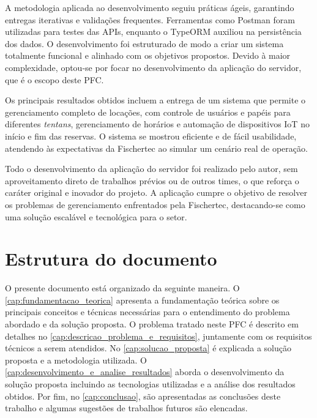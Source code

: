 A metodologia aplicada ao desenvolvimento seguiu práticas ágeis, garantindo entregas iterativas e validações frequentes. Ferramentas como Postman foram utilizadas para testes das APIs, enquanto o TypeORM auxiliou na persistência dos dados. O desenvolvimento foi estruturado de modo a criar um sistema totalmente funcional e alinhado com os objetivos propostos. Devido à maior complexidade, optou-se por focar no desenvolvimento da aplicação do servidor, que é o escopo deste PFC.

Os principais resultados obtidos incluem a entrega de um sistema que permite o gerenciamento completo de locações, com controle de usuários e papéis para diferentes \textit{tentans}, gerenciamento de horários e automação de dispositivos IoT no início e fim das reservas. O sistema se mostrou eficiente e de fácil usabilidade, atendendo às expectativas da Fischertec ao simular um cenário real de operação. 

Todo o desenvolvimento da aplicação do servidor foi realizado pelo autor, sem aproveitamento direto de trabalhos prévios ou de outros times, o que reforça o caráter original e inovador do projeto. A aplicação cumpre o objetivo de resolver os problemas de gerenciamento enfrentados pela Fischertec, destacando-se como uma solução escalável e tecnológica para o setor.

\section{Estrutura do documento}

O presente documento está organizado da seguinte maneira. O \autoref{cap:fundamentacao_teorica} apresenta a fundamentação teórica sobre os principais conceitos e técnicas necessárias para o entendimento do problema abordado e da solução proposta. O problema tratado neste PFC é descrito em detalhes no \autoref{cap:descricao_problema_e_requisitos}, juntamente com os requisitos técnicos a serem atendidos. No \autoref{cap:solucao_proposta} é explicada a solução proposta e a metodologia utilizada. O \autoref{cap:desenvolvimento_e_analise_resultados} aborda o desenvolvimento da solução proposta incluindo as tecnologias utilizadas e a análise dos resultados obtidos. Por fim, no \autoref{cap:conclusao}, são apresentadas as conclusões deste trabalho e algumas sugestões de trabalhos futuros são elencadas.